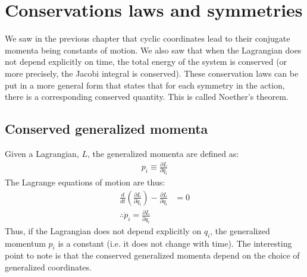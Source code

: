 %
\chapter{Conservations laws and symmetries}
\label{chap:ConsLaws}
We saw in the previous chapter that cyclic coordinates lead to their conjugate momenta being constants of motion. We also saw that when the Lagrangian does not depend explicitly on time, the total energy of the system is conserved (or more precisely, the Jacobi integral is conserved). These conservation laws can be put in a more general form that states that for each symmetry in the action, there is a corresponding conserved quantity. This is called Noether's theorem.

\section{Conserved generalized momenta}
Given a Lagrangian, $L$, the generalized momenta are defined as:
\begin{align}
p_i\equiv\frac{\partial L}{\partial \dot{q}_i}
\end{align}
The Lagrange equations of motion are thus:
\begin{align}
\frac{d}{dt}\left(\frac{\partial L}{\partial \dot{q}_i}\right)-\frac{\partial L}{\partial q_i}&=0\nonumber\\
\therefore \dot{p}_i=\frac{\partial L}{\partial q_i}
\end{align}
Thus, if the Lagrangian does not depend explicitly on $q_i$, the generalized momentum $p_i$ is a constant (i.e. it does not change with time). The interesting point to note is that the conserved generalized momenta depend on the choice of generalized coordinates.

